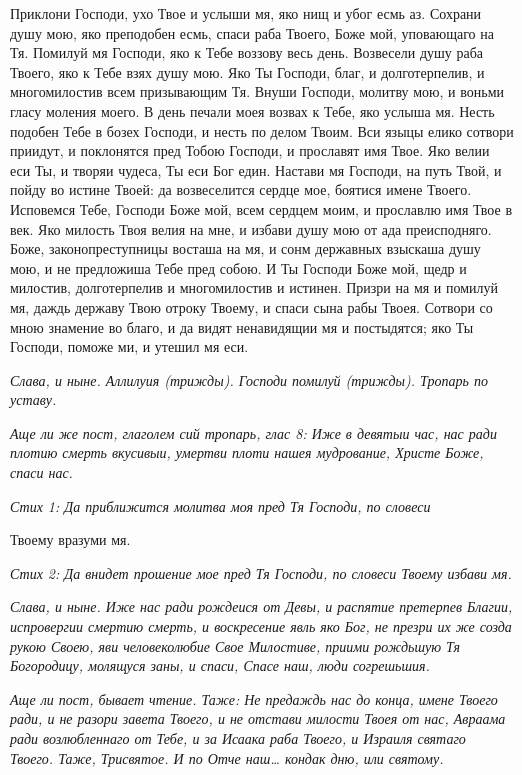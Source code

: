    Приклони Господи, ухо Твое и услыши мя, яко нищ и убог есмь аз.
Сохрани душу мою, яко преподобен есмь, спаси раба Твоего, Боже мой,
уповающаго на Тя. Помилуй мя Господи, яко к Тебе воззову весь день.
Возвесели душу раба Твоего, яко к Тебе взях душу мою. Яко Ты
Господи, благ, и долготерпелив, и многомилостив всем призывающим Тя.
Внуши Господи, молитву мою, и воньми гласу моления моего. В день
печали моея возвах к Тебе, яко услыша мя. Несть подобен Тебе в
бозех Господи, и несть по делом Твоим. Вси языцы елико сотвори
приидут, и поклонятся пред Тобою Господи, и прославят имя Твое.
Яко велии еси Ты, и творяи чудеса, Ты еси Бог един. Настави мя
Господи, на путь Твой, и пойду во истине Твоей: да возвеселится
сердце мое, боятися имене Твоего. Исповемся Тебе, Господи Боже
мой, всем сердцем моим, и прославлю имя Твое в век. Яко милость
Твоя велия на мне, и избави душу мою от ада преисподняго. Боже,
законопреступницы восташа на мя, и сонм державных взыскаша душу
мою, и не предложиша Тебе пред собою. И Ты Господи Боже мой,
щедр и милостив, долготерпелив и многомилостив и истинен. Призри
на мя и помилуй мя, даждь державу Твою отроку Твоему, и спаси
сына рабы Твоея. Сотвори со мною знамение во благо, и да видят
ненавидящии мя и постыдятся; яко Ты Господи, поможе ми, и утешил мя
еси.


 \itshape Слава, и ныне\normalfont{}. Аллилуия \itshape (трижды)\normalfont{}. Господи помилуй \itshape (трижды).
Тропарь по уставу.\normalfont{}


 \itshape Аще ли же пост, глаголем сий тропарь, глас 8:\normalfont{} Иже в девятыи час, нас
ради плотию смерть вкусивыи, умертви плоти нашея мудрование, Христе
Боже, спаси нас.


 \itshape Стих 1:\normalfont{} Да приближится молитва моя пред Тя Господи, по словеси

Твоему вразуми мя.


 \itshape Стих 2:\normalfont{} Да внидет прошение мое пред Тя Господи, по словеси Твоему
избави мя.


 \itshape Слава, и ныне\normalfont{}. Иже нас ради рождеися от Девы, и распятие претерпев
Благии, испровергии смертию смерть, и воскресение явль яко Бог, не презри
их же созда рукою Своею, яви человеколюбие Свое Милостиве, приими
рождьшую Тя Богородицу, молящуся заны, и спаси, Спасе наш, люди
согрешьшия.


 \itshape Аще ли пост, бывает чтение. Таже:\normalfont{} Не предаждь нас до конца, имене
Твоего ради, и не разори завета Твоего, и не отстави милости Твоея от нас,
Авраама ради возлюбленнаго от Тебе, и за Исаака раба Твоего, и Израиля
святаго Твоего. \itshape Таже\normalfont{}, \itshape Трисвятое\normalfont{}. \itshape И по\normalfont{} Отче наш… \itshape кондак дню, или
святому.\normalfont{}


